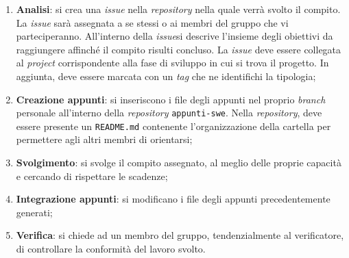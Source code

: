 \begin{enumerate}
	\item \textbf{Analisi}: si crea una \textit{issue\g} nella \textit{repository\g} nella quale verrà svolto il compito.
	      La \textit{issue\g} sarà assegnata a se stessi o ai membri del gruppo che vi parteciperanno.
	      All'interno della \textit{issue}\g si descrive l'insieme degli obiettivi da raggiungere affinché il compito risulti concluso.
	      La \textit{issue} deve essere collegata al \textit{project} corrispondente alla fase di sviluppo in cui si trova il progetto.
	      In aggiunta, deve essere marcata con un \textit{tag} che ne identifichi la tipologia;

	\item \textbf{Creazione appunti}: si inseriscono i file degli
	      appunti nel proprio \textit{branch} personale all'interno
	      della \textit{repository\g} \texttt{appunti-swe}.
	      Nella \textit{repository\g}, deve essere presente un \texttt{README.md}
	      contenente l'organizzazione della cartella per permettere agli altri
	      membri di orientarsi;

	\item \textbf{Svolgimento}: si svolge il compito assegnato, al meglio
	      delle proprie capacità e cercando di rispettare le scadenze;

	\item \textbf{Integrazione appunti}: si modificano i file degli
	      appunti precedentemente generati;

	\item \textbf{Verifica}: si chiede ad un membro del gruppo,
	      tendenzialmente al verificatore, di controllare la conformità del
	      lavoro svolto.
\end{enumerate}
